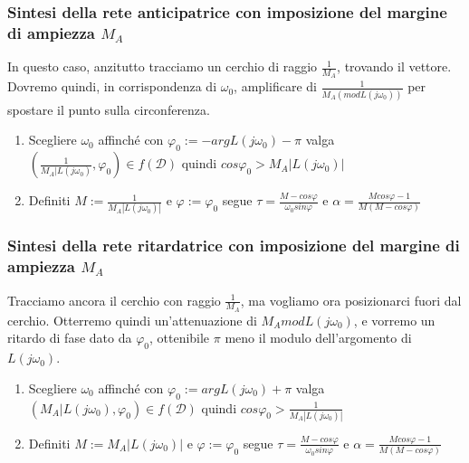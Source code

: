\documentclass[11pt]{article}
\begin{document}
\subsubsection{Sintesi della rete anticipatrice con imposizione del margine di ampiezza $M_A$}
In questo caso, anzitutto tracciamo un cerchio di raggio $\frac{1}{M_A}$, trovando il vettore. Dovremo quindi, in corrispondenza di $\omega_0$, amplificare di $\frac{1}{M_A(mod L(j\omega_0))}$ per spostare il punto sulla circonferenza.
\begin{enumerate}
    \item Scegliere $\omega_0$ affinché con $\varphi_0 := - argL(j\omega_0)-\pi$ valga $\left(\frac{1}{M_A|L(j\omega_0)}, \varphi_0\right) \in f(\mathcal{D})$ quindi $cos\varphi_0 > M_A|L(j\omega_0)|$
    \item Definiti $M:=\frac{1}{M_A|L(j\omega_0)|}$ e $\varphi := \varphi_0$ segue $\tau = \frac{M-cos\varphi}{\omega_0 sin\varphi} $ e $\alpha=\frac{Mcos\varphi-1}{M(M-cos\varphi)}$
\end{enumerate}
\subsubsection{Sintesi della rete ritardatrice con imposizione del margine di ampiezza $M_A$}
Tracciamo ancora il cerchio con raggio $\frac{1}{M_A}$, ma vogliamo ora posizionarci fuori dal cerchio. Otterremo quindi un'attenuazione di $M_A modL(j\omega_0)$, e vorremo un ritardo di fase dato da $\varphi_0$, ottenibile $\pi$ meno il modulo dell'argomento di $L(j\omega_0)$.
\begin{enumerate}
    \item Scegliere $\omega_0$ affinché con $\varphi_0 := argL(j\omega_0)+\pi$ valga $\left(M_A|L(j\omega_0), \varphi_0\right) \in f(\mathcal{D})$ quindi $cos\varphi_0 > \frac{1}{M_A|L(j\omega_0)|}$
    \item Definiti $M:=M_A|L(j\omega_0)|$ e $\varphi := \varphi_0$ segue $\tau = \frac{M-cos\varphi}{\omega_0 sin\varphi} $ e $\alpha=\frac{Mcos\varphi-1}{M(M-cos\varphi)}$
\end{enumerate}
\end{document}

